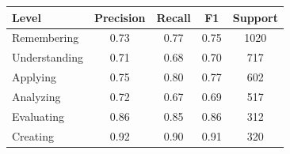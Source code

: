 \begin{tabular}{lcccc}
\hline
Level & Precision & Recall & F1 & Support \\
\hline
Remembering & 0.73 & 0.77 & 0.75 & 1020 \\
Understanding & 0.71 & 0.68 & 0.70 & 717 \\
Applying & 0.75 & 0.80 & 0.77 & 602 \\
Analyzing & 0.72 & 0.67 & 0.69 & 517 \\
Evaluating & 0.86 & 0.85 & 0.86 & 312 \\
Creating & 0.92 & 0.90 & 0.91 & 320 \\
\hline
\end{tabular}